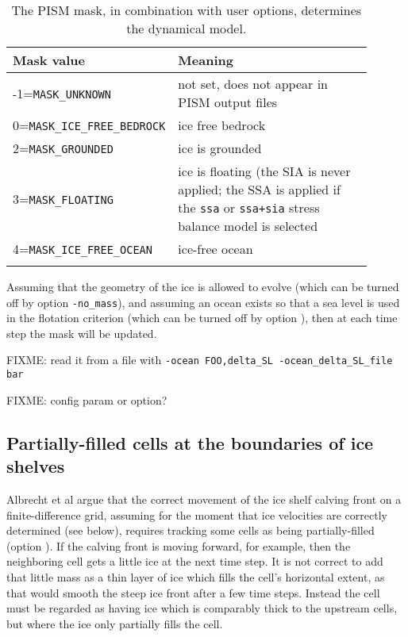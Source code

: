 \begin{table}[ht]
  \centering
 \small
  \begin{tabular}{p{0.25\linewidth}p{0.65\linewidth}}
    \toprule
    \textbf{Mask value} & \textbf{Meaning}\\
    \midrule
    -1=\texttt{MASK_UNKNOWN} & not set, does not appear in PISM output files \\
    0=\texttt{MASK_ICE_FREE_BEDROCK} & ice free bedrock \\
    2=\texttt{MASK_GROUNDED}& ice is grounded \\
    3=\texttt{MASK_FLOATING} & ice is floating (the SIA is never applied; the SSA is applied if the \texttt{ssa} or \texttt{ssa+sia} stress balance model is selected\\
    4=\texttt{MASK_ICE_FREE_OCEAN} & ice-free ocean \\
    \\\bottomrule
  \end{tabular}
  \normalsize
  \caption{The PISM mask, in combination with user options, determines the dynamical model.}
  \label{tab:maskvals} 
\end{table}

Assuming that the geometry of the ice is allowed to evolve (which can be turned off by option \texttt{-no_mass}), and assuming an ocean exists so that a sea level is used in the flotation criterion (which can be turned off by option ), then at each time step the mask will be updated.

FIXME: read it from a file with \texttt{-ocean FOO,delta_SL -ocean_delta_SL_file bar}

FIXME: config param or option?


\subsection{Partially-filled cells at the boundaries of ice shelves}
\label{sec:part-grid}
Albrecht et al \cite{Albrechtetal2011} argue that the correct movement of the ice shelf calving front on a finite-difference grid, assuming for the moment that ice velocities are correctly determined (see below), requires tracking some cells as being partially-filled (option ).  If the calving front is moving forward, for example, then the neighboring cell gets a little ice at the next time step.  It is not correct to add that little mass as a thin layer of ice which fills the cell's horizontal extent, as that would smooth the steep ice front after a few time steps.  Instead the cell must be regarded as having ice which is comparably thick to the upstream cells, but where the ice only partially fills the cell.


